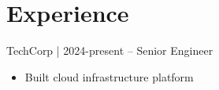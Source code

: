 \documentclass{article}
\newcommand{\datedsubsection}[2]{#2 -- #1}
\begin{document}
\section{Experience}
\datedsubsection{Senior Engineer}{TechCorp | 2024-present}
\begin{itemize}
\item Built cloud infrastructure platform
\end{itemize}
\end{document}
